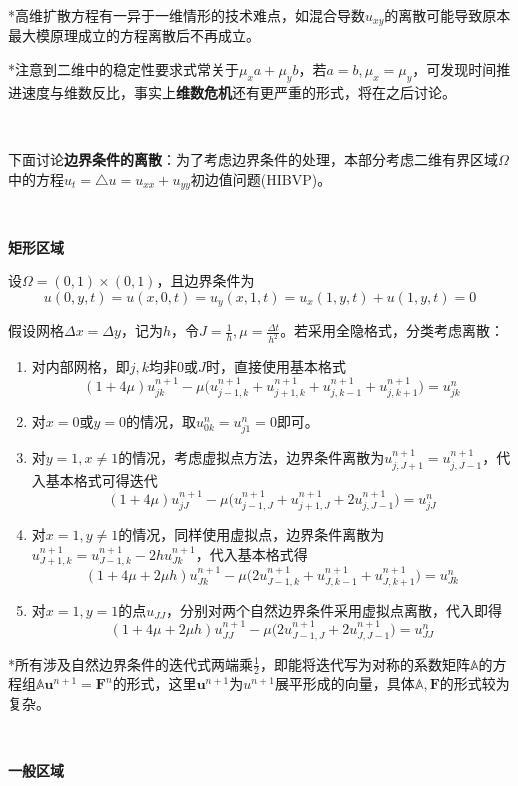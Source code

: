 \documentclass[a4paper,UTF8,fontset=windows]{ctexart}
\newcommand*{\bu}{\mathbf{u}}
\begin{document}
*高维扩散方程有一异于一维情形的技术难点，如混合导数$u_{xy}$的离散可能导致原本最大模原理成立的方程离散后不再成立。

*注意到二维中的稳定性要求式常关于$\mu_xa+\mu_yb$，若$a=b,\mu_x=\mu_y$，可发现时间推进速度与维数反比，事实上\textbf{维数危机}还有更严重的形式，将在之后讨论。

\

下面讨论\textbf{边界条件的离散}：为了考虑边界条件的处理，本部分考虑二维有界区域$\Omega$中的方程$u_t=\triangle u=u_{xx}+u_{yy}$初边值问题(HIBVP)。

\

\textbf{矩形区域}

设$\Omega=(0,1)\times(0,1)$，且边界条件为
$$u(0,y,t)=u(x,0,t)=u_y(x,1,t)=u_x(1,y,t)+u(1,y,t)=0$$

假设网格$\Delta x=\Delta y$，记为$h$，令$J=\frac{1}{h},\mu=\frac{\Delta t}{h^2}$。若采用全隐格式，分类考虑离散：
\begin{enumerate}
    \item 对内部网格，即$j,k$均非0或$J$时，直接使用基本格式
        $$(1+4\mu)u_{jk}^{n+1}-\mu\big(u_{j-1,k}^{n+1}+u_{j+1,k}^{n+1}+u_{j,k-1}^{n+1}+u_{j,k+1}^{n+1}\big)=u_{jk}^n$$
    \item 对$x=0$或$y=0$的情况，取$u_{0k}^n=u_{j1}^n=0$即可。
    \item 对$y=1,x\ne1$的情况，考虑虚拟点方法，边界条件离散为$u_{j,J+1}^{n+1}=u_{j,J-1}^{n+1}$，代入基本格式可得迭代
    $$(1+4\mu)u_{jJ}^{n+1}-\mu\big(u_{j-1,J}^{n+1}+u_{j+1,J}^{n+1}+2u_{j,J-1}^{n+1}\big)=u_{jJ}^n$$

    \item 对$x=1,y\ne1$的情况，同样使用虚拟点，边界条件离散为$u_{J+1,k}^{n+1}=u_{J-1,k}^{n+1}-2hu_{Jk}^{n+1}$，代入基本格式得
    $$(1+4\mu+2\mu h)u_{Jk}^{n+1}-\mu\big(2u_{J-1,k}^{n+1}+u_{J,k-1}^{n+1}+u_{J,k+1}^{n+1}\big)=u_{Jk}^n$$

    \item 对$x=1,y=1$的点$u_{JJ}$，分别对两个自然边界条件采用虚拟点离散，代入即得
    $$(1+4\mu+2\mu h)u_{JJ}^{n+1}-\mu\big(2u_{J-1,J}^{n+1}+2u_{J,J-1}^{n+1}\big)=u_{JJ}^n$$
\end{enumerate}

*所有涉及自然边界条件的迭代式两端乘$\frac{1}{2}$，即能将迭代写为对称的系数矩阵$\mathbb{A}$的方程组$\mathbb{A}\bu^{n+1}=\mathbf{F}^n$的形式，这里$\bu^{n+1}$为$u^{n+1}$展平形成的向量，具体$\mathbb{A},\mathbf{F}$的形式较为复杂。

\

\textbf{一般区域}
\end{document}
